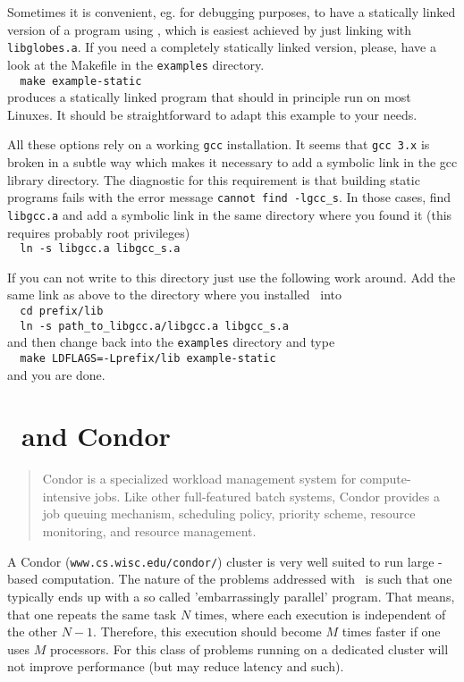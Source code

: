 Sometimes it is convenient, eg. for debugging purposes, to have a
statically linked version of a program using \GLOBES, which is easiest
achieved by just linking with \verb+libglobes.a+. If you need a completely
statically linked version, please, have a look at the Makefile in the
\verb+examples+ directory.\\
\verb+  make example-static+\\ 
produces a statically linked program that should in principle run on
most Linuxes.  It should be straightforward to adapt this example to
your needs.

All these options rely on a working \verb+gcc+ installation. It seems that
\verb+gcc 3.x+ is broken in a subtle way which makes it necessary to add a
symbolic link in the gcc library directory. The diagnostic for this
requirement is that building static programs fails with the error
message \verb+cannot find -lgcc_s+. In those cases, find \verb+libgcc.a+ and add
a symbolic link in the same directory where you found it (this
requires probably root privileges)\\
\verb+  ln -s libgcc.a libgcc_s.a+

If you can not write to this directory just use the following work
around. Add the same link as above to the directory where you
installed \GLOBES\ into\\
\verb+  cd prefix/lib+\\       
\verb+  ln -s path_to_libgcc.a/libgcc.a libgcc_s.a+\\
and then change back into the \verb+examples+ directory and type\\
\verb+  make LDFLAGS=-Lprefix/lib example-static+\\
and you are done.

\section*{\GLOBES\ and Condor}
\label{sec:condor}
\begin{quote}
  Condor is a specialized workload management system for
  compute-intensive jobs. Like other full-featured batch systems,
  Condor provides a job queuing mechanism, scheduling policy,
  priority scheme, resource monitoring, and resource management.
\end{quote} 

A Condor (\verb+www.cs.wisc.edu/condor/+) cluster is very well suited
to run large \GLOBES-based computation. The nature of the problems
addressed with \GLOBES\ is such that one typically ends up with a so
called 'embarrassingly parallel' program. That means, that one repeats
the same task $N$ times, where each execution is independent of the
other $N-1$. Therefore, this execution should become $M$ times faster
if one uses $M$ processors. For this class of problems running on a
dedicated cluster will not improve performance (but may reduce latency
and such).

